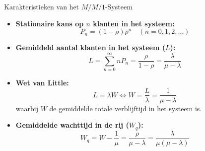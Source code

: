 \documentclass[11pt,a4paper]{article}
\begin{document}
\begin{theobox}{Karakteristieken van het $M/M/1$-Systeem}
\begin{itemize}[leftmargin=1.2em]
    \item \textbf{Stationaire kans op $n$ klanten in het systeem:}
    \begin{equation}
        P_n = (1 - \rho)\rho^n \quad (n = 0, 1, 2, \ldots)
    \end{equation}
    \item \textbf{Gemiddeld aantal klanten in het systeem ($L$):}
    \begin{equation}
        L = \sum_{n=0}^\infty n P_n = \frac{\rho}{1 - \rho} = \frac{\lambda}{\mu - \lambda}
    \end{equation}
    \item \textbf{Wet van Little:}
    \begin{equation}
        L = \lambda W \iff W = \frac{L}{\lambda} = \frac{1}{\mu - \lambda}
    \end{equation}
    waarbij $W$ de gemiddelde totale verblijftijd in het systeem is.
    \item \textbf{Gemiddelde wachttijd in de rij ($W_q$):}
    \begin{equation}
        W_q = W - \frac{1}{\mu} = \frac{\rho}{\mu - \lambda} = \frac{\lambda}{\mu(\mu - \lambda)}
    \end{equation}
\end{itemize}
\end{theobox}
\end{document}
